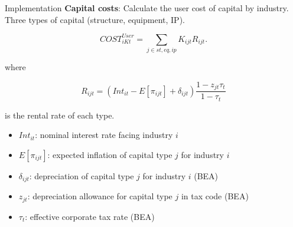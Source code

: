 \documentclass[10pt, xcolor=dvipsnames]{beamer}
\begin{document}
\begin{frame}{Implementation}
\textbf{Capital costs}: Calculate the user cost of capital by industry. Three types of capital (structure, equipment, IP).

\begin{equation}
  COST^{User}_{iKt} = \sum_{j \in st,eq,ip} K_{ijt} R_{ijt}.
\end{equation}

where 

\begin{equation}
  R_{ijt} = (Int_{it} - E[\pi_{ijt}] + \delta_{ijt})\frac{1-z_{jt} \tau_t}{1-\tau_t}
\end{equation}

is the rental rate of each type. 

\begin{itemize}
  \item $Int_{it}$: nominal interest rate facing industry $i$
  \item $E[\pi_{ijt}]$: expected inflation of capital type $j$ for industry $i$
  \item $\delta_{ijt}$: depreciation of capital type $j$ for industry $i$ (BEA)
  \item $z_{jt}$: depreciation allowance for capital type $j$ in tax code (BEA)
  \item $\tau_t$: effective corporate tax rate (BEA)
\end{itemize}

\end{frame}

%
%



\end{document}
